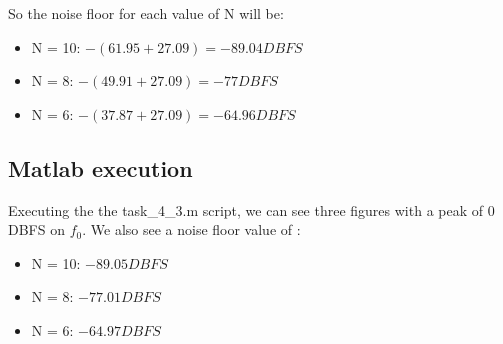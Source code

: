 So the noise floor for each value of N will be:
\begin{itemize}
    \item N = 10: $-(61.95 + 27.09) = -89.04 DBFS $
    \item N = 8: $-(49.91 + 27.09) = -77 DBFS$
    \item N = 6: $-(37.87 + 27.09) = -64.96 DBFS$
\end{itemize}

\subsection{Matlab execution}

Executing the the task\_4\_3.m script, we can see three figures with a peak of 0 DBFS on $f_0$.
We also see a noise floor value of :
\begin{itemize}
    \item N = 10: $-89.05 DBFS $
    \item N = 8: $-77.01 DBFS$
    \item N = 6: $-64.97 DBFS$
\end{itemize}

